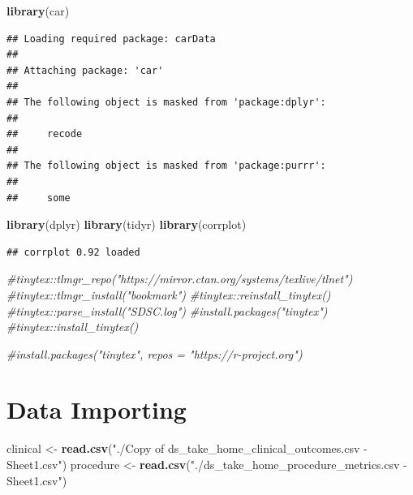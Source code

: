 \documentclass[
]{article}
\newenvironment{Shaded}{\begin{snugshade}}{\end{snugshade}}
\newcommand{\CommentTok}[1]{\textcolor[rgb]{0.56,0.35,0.01}{\textit{#1}}}
\newcommand{\FunctionTok}[1]{\textcolor[rgb]{0.13,0.29,0.53}{\textbf{#1}}}
\newcommand{\NormalTok}[1]{#1}
\newcommand{\OtherTok}[1]{\textcolor[rgb]{0.56,0.35,0.01}{#1}}
\newcommand{\StringTok}[1]{\textcolor[rgb]{0.31,0.60,0.02}{#1}}
\begin{document}
\begin{Shaded}
\begin{Highlighting}[]
\FunctionTok{library}\NormalTok{(car)}
\end{Highlighting}
\end{Shaded}

\begin{verbatim}
## Loading required package: carData
## 
## Attaching package: 'car'
## 
## The following object is masked from 'package:dplyr':
## 
##     recode
## 
## The following object is masked from 'package:purrr':
## 
##     some
\end{verbatim}

\begin{Shaded}
\begin{Highlighting}[]
\FunctionTok{library}\NormalTok{(dplyr)}
\FunctionTok{library}\NormalTok{(tidyr)}
\FunctionTok{library}\NormalTok{(corrplot)}
\end{Highlighting}
\end{Shaded}

\begin{verbatim}
## corrplot 0.92 loaded
\end{verbatim}

\begin{Shaded}
\begin{Highlighting}[]
\CommentTok{\#tinytex::tlmgr\_repo("https://mirror.ctan.org/systems/texlive/tlnet")}
\CommentTok{\#tinytex::tlmgr\_install("bookmark")}
\CommentTok{\#tinytex::reinstall\_tinytex()}
\CommentTok{\#tinytex::parse\_install("SDSC.log")}
\CommentTok{\#install.packages("tinytex")}
\CommentTok{\#tinytex::install\_tinytex()}

\CommentTok{\#install.packages("tinytex", repos = "https://r{-}project.org")}
\end{Highlighting}
\end{Shaded}

\section{Data Importing}\label{data-importing}

\begin{Shaded}
\begin{Highlighting}[]
\NormalTok{clinical }\OtherTok{\textless{}{-}} \FunctionTok{read.csv}\NormalTok{(}\StringTok{"./Copy of ds\_take\_home\_clinical\_outcomes.csv {-} Sheet1.csv"}\NormalTok{)}
\NormalTok{procedure }\OtherTok{\textless{}{-}} \FunctionTok{read.csv}\NormalTok{(}\StringTok{"./ds\_take\_home\_procedure\_metrics.csv {-} Sheet1.csv"}\NormalTok{)}
\end{Highlighting}
\end{Shaded}
\end{document}
